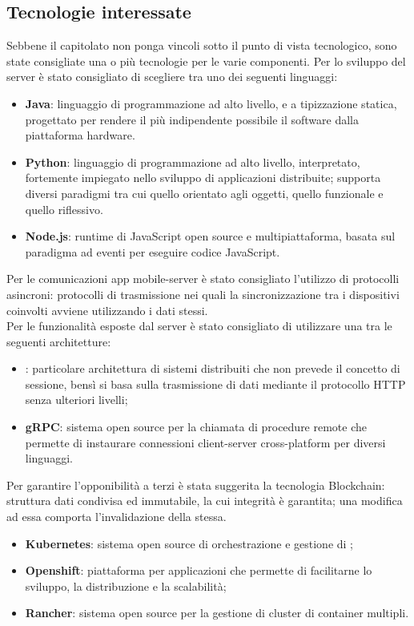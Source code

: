 \documentclass[../studio-di-fattibilita.tex]{subfiles}
\begin{document}
\subsection{Tecnologie interessate}%
\label{sub:c1_tecnologie_interessate}
Sebbene il capitolato non ponga vincoli sotto il punto di vista tecnologico, sono state consigliate una o più tecnologie per le varie componenti.
Per lo sviluppo del server è stato consigliato di scegliere tra uno dei seguenti linguaggi:
\begin{itemize}
  \item \textbf{Java}: linguaggio di programmazione ad alto livello,  e a tipizzazione statica, progettato per rendere il più indipendente possibile il software dalla piattaforma hardware.
  \item \textbf{Python}: linguaggio di programmazione ad alto livello, interpretato, fortemente impiegato nello sviluppo di applicazioni distribuite; supporta diversi paradigmi tra cui quello orientato agli oggetti, quello funzionale e quello riflessivo.
  \item \textbf{Node.js}: runtime di JavaScript open source e multipiattaforma, basata sul paradigma ad eventi per eseguire codice JavaScript.
\end{itemize}

Per le comunicazioni app mobile-server è stato consigliato l’utilizzo di protocolli asincroni: protocolli di trasmissione nei quali la sincronizzazione tra i dispositivi coinvolti avviene utilizzando i dati stessi. \\

Per le funzionalità esposte dal server è stato consigliato di utilizzare una tra le seguenti architetture:
\begin{itemize}
  \item \textbf{}: particolare architettura di sistemi distribuiti che non prevede il concetto di sessione, bensì si basa sulla trasmissione di dati mediante il protocollo HTTP senza ulteriori livelli;
  \item \textbf{gRPC}: sistema open source per la chiamata di procedure remote che permette di instaurare connessioni client-server cross-platform per diversi linguaggi.
\end{itemize}

Per garantire l’opponibilità a terzi è stata suggerita la tecnologia Blockchain: struttura dati condivisa ed immutabile, la cui integrità è garantita; una modifica ad essa comporta l’invalidazione della stessa.
\begin{itemize}
  \item \textbf{Kubernetes}: sistema open source di orchestrazione e gestione di ;
  \item \textbf{Openshift}: piattaforma per applicazioni  che permette di facilitarne lo sviluppo, la distribuzione e la scalabilità;
  \item \textbf{Rancher}: sistema open source per la gestione di cluster di container multipli.
\end{itemize}
\end{document}
